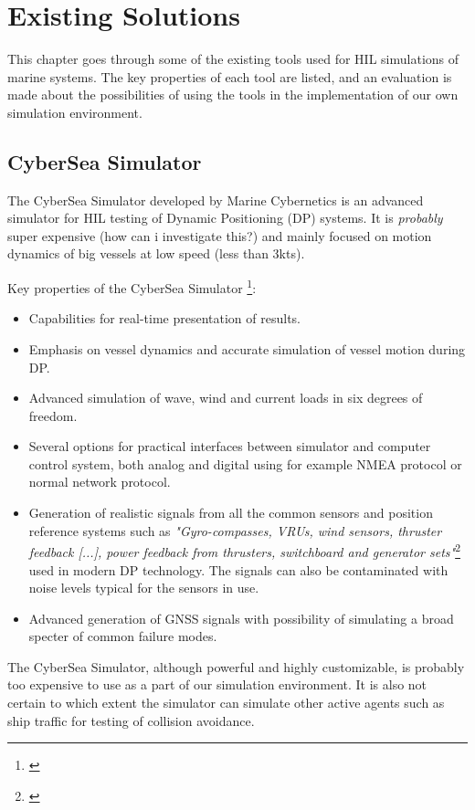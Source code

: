 \chapter{Existing Solutions}
This chapter goes through some of the existing tools used for HIL simulations of marine systems. The key properties of each tool are listed, and an evaluation is made about the possibilities of using the tools in the implementation of our own simulation environment. 

\section{CyberSea Simulator}
The CyberSea Simulator developed by Marine Cybernetics is an advanced simulator for HIL testing of Dynamic Positioning (DP) systems. It is \emph{probably} super expensive (how can i investigate this?) and mainly focused on motion dynamics of big vessels at low speed (less than 3kts).

Key properties of the CyberSea Simulator \footnote{\cite{HILtestingDP}}:
\begin{itemize}
\item Capabilities for real-time presentation of results.
\item Emphasis on vessel dynamics and accurate simulation of vessel motion during DP.
\item Advanced simulation of wave, wind and current loads in six degrees of freedom.
\item Several options for practical interfaces between simulator and computer control system, both analog and digital using for example NMEA protocol or normal network protocol.
\item Generation of realistic signals from all the common sensors and position reference systems such as \textit{"Gyro-compasses, VRUs, wind sensors, thruster feedback [...], power feedback from thrusters, switchboard and generator sets"}\footnote{\cite{HILtestingDP}} used in modern DP technology. The signals can also be contaminated with noise levels typical for the sensors in use.
\item Advanced generation of GNSS signals with possibility of simulating a broad specter of common failure modes.
\end{itemize}

The CyberSea Simulator, although powerful and highly customizable, is probably too expensive to use as a part of our simulation environment. It is also not certain to which extent the simulator can simulate other active agents such as ship traffic for testing of collision avoidance.



